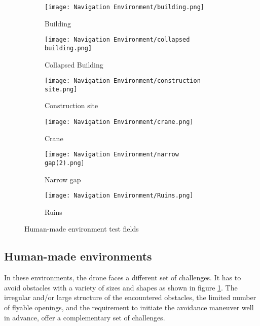 \begin{figure}[!h]
	\centering
	\begin{subfigure}[b]{0.29\textwidth}
		\centering
		\texttt{[image: Navigation Environment/building.png]}
		\caption{Building}
	\end{subfigure}
	\hfill
	\begin{subfigure}[b]{0.29\textwidth}
		\centering
		\texttt{[image: Navigation Environment/collapsed building.png]}
		\caption{Collapsed Building}
	\end{subfigure}
	\hfill	
	\begin{subfigure}[b]{0.29\textwidth}
		\centering
		\texttt{[image: Navigation Environment/construction site.png]}
		\caption{Construction site}
	\end{subfigure}
	\hfill
	\begin{subfigure}[b]{0.29\textwidth}
		\centering
		\texttt{[image: Navigation Environment/crane.png]}
		\caption{Crane}
	\end{subfigure}
	\hfill
	\begin{subfigure}[b]{0.29\textwidth}
		\centering
		\texttt{[image: Navigation Environment/narrow gap(2).png]}
		\caption{Narrow gap}
	\end{subfigure}
	\hfill
	\begin{subfigure}[b]{0.29\textwidth}
		\centering
		\texttt{[image: Navigation Environment/Ruins.png]}
		\caption{Ruins}
	\end{subfigure}
	
	\caption{Human-made environment test fields}
	\label{fig:human envt}
\end{figure}


\subsection{Human-made environments}
In these environments, the drone faces a different set of challenges. It has to avoid obstacles with a variety of sizes and shapes as shown in figure \ref{fig:human envt}. The irregular and/or large structure of the encountered obstacles, the limited number of flyable openings, and the requirement to initiate the avoidance maneuver well in advance, offer a complementary set of challenges.

